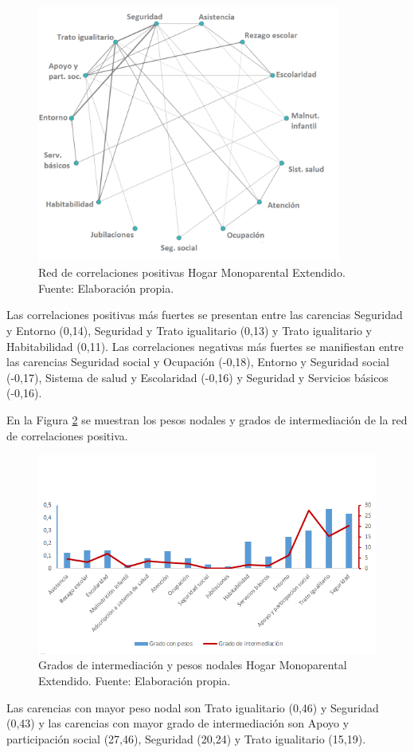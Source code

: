 \documentclass[12pt,letterpaper,spanish]{article}
\begin{document}
\begin{figure}[H]
  \centering
    \includegraphics[width=10cm]{Grafos/grafo_monoex_pos.png}
    \caption{Red de correlaciones positivas Hogar Monoparental Extendido. Fuente: Elaboración propia.}
    \label{RedMonoexpos}
\end{figure}
Las correlaciones positivas más fuertes se presentan entre las carencias Seguridad y Entorno (0,14), Seguridad y Trato igualitario (0,13) y Trato igualitario y Habitabilidad (0,11). Las correlaciones negativas más fuertes se manifiestan entre las carencias Seguridad social y Ocupación (-0,18), Entorno y Seguridad social (-0,17), Sistema de salud y Escolaridad (-0,16) y Seguridad y Servicios básicos (-0,16). 

En la Figura \ref{CenMonoex} se muestran los pesos nodales y grados de intermediación de la red de correlaciones positiva.

\begin{figure}[H]
    \centering
    \includegraphics[width=\textwidth]{Grafos/nc_monoex.png}
    \caption{Grados de intermediación y pesos nodales Hogar Monoparental Extendido. Fuente: Elaboración propia.}
    \label{CenMonoex}
\end{figure}
Las carencias con mayor peso nodal son Trato igualitario (0,46) y Seguridad (0,43) y las carencias con mayor grado de intermediación son Apoyo y participación social (27,46), Seguridad (20,24) y Trato igualitario (15,19).
\end{document}
